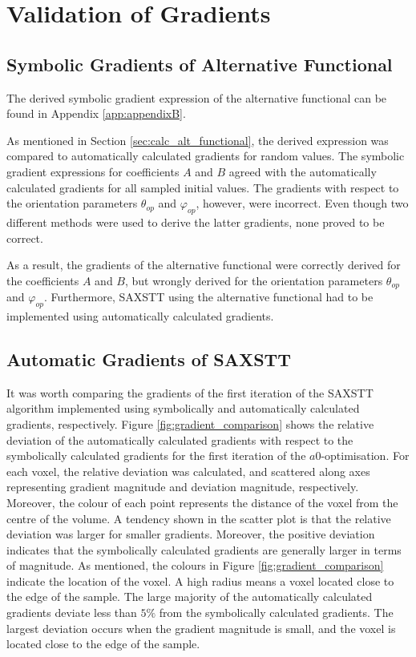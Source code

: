 \chapter{Validation of Gradients}


\section{Symbolic Gradients of Alternative Functional}

The derived symbolic gradient expression of the alternative functional can be found in Appendix \ref{app:appendixB}.

As mentioned in Section \ref{sec:calc_alt_functional}, the derived expression was compared to automatically calculated gradients for random values.
The symbolic gradient expressions for coefficients $A$ and $B$ agreed with the automatically calculated gradients for all sampled initial values.
The gradients with respect to the orientation parameters $\theta_{op}$ and $\varphi_{op}$, however, were incorrect.
Even though two different methods were used to derive the latter gradients, none proved to be correct.

As a result, the gradients of the alternative functional were correctly derived for the coefficients $A$ and $B$,
but wrongly derived for the orientation parameters $\theta_{op}$ and $\varphi_{op}$.
Furthermore, SAXSTT using the alternative functional had to be implemented using automatically calculated gradients.

\section{Automatic Gradients of SAXSTT}

It was worth comparing the gradients of the first iteration of the SAXSTT algorithm implemented using symbolically and automatically calculated gradients, respectively.
Figure \ref{fig:gradient_comparison} shows
the relative deviation of the automatically calculated gradients with respect to the symbolically calculated gradients for the first iteration of the $a0$-optimisation.
For each voxel, the relative deviation was calculated, and scattered along axes representing gradient magnitude and deviation magnitude, respectively.
Moreover, the colour of each point represents the distance of the voxel from the centre of the volume.
A tendency shown in the scatter plot is that the relative deviation was larger for smaller gradients.
Moreover, the positive deviation indicates that the symbolically calculated gradients are generally larger in terms of magnitude.
As mentioned, the colours in Figure \ref{fig:gradient_comparison} indicate the location of the voxel. A high radius means a voxel located close to the edge of the sample.
The large majority of the automatically calculated gradients deviate less than $5\%$ from the symbolically calculated gradients.
The largest deviation occurs when the gradient magnitude is small, and the voxel is located close to the edge of the sample.


